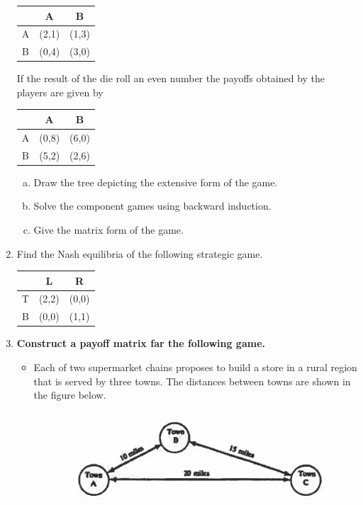 \documentclass[]{report}
\begin{document}
\begin{enumerate}
\begin{center}
	\begin{tabular}{|c|c|c|} \hline 
		& A & B \\ \hline
		A & (2,1)& (1,3) \\ \hline
		B & (0,4) & (3,0) \\ \hline
	\end{tabular}
\end{center}
If the result of the die roll an even number the payoffs obtained by the players are given
by
\begin{center}
	\begin{tabular}{|c|c|c|} \hline 
		& A & B \\ \hline
		A & (0,8) & (6,0) \\ \hline
		B & (5,2) & (2,6) \\ \hline
	\end{tabular}
\end{center}

\begin{enumerate}[(a)]
	\item  Draw the tree depicting the extensive form of the game.
	\item Solve the component games using backward induction.
	\item  Give the matrix form of the game.
\end{enumerate}


\item Find the Nash equilibria of the following strategic game.

\begin{center}
	\begin{tabular}{|c|c|c|} \hline 
		& L & R \\ \hline
		T & (2,2) & (0,0) \\ \hline
		B & (0,0) & (1,1) \\ \hline
	\end{tabular}
\end{center}

\item \textbf{Construct a payoff matrix far the following game.}\\

\begin{itemize}
	\item Each of two supermarket chains proposes to 
	build a store in a rural region that is served by three towns. The distances between towns are 
	shown in the figure below.\begin{figure}[h!]
		\centering
		\includegraphics[width=0.45\linewidth]{Q35}
	\end{figure}
	

\end{itemize}
\end{enumerate}
\end{document}
